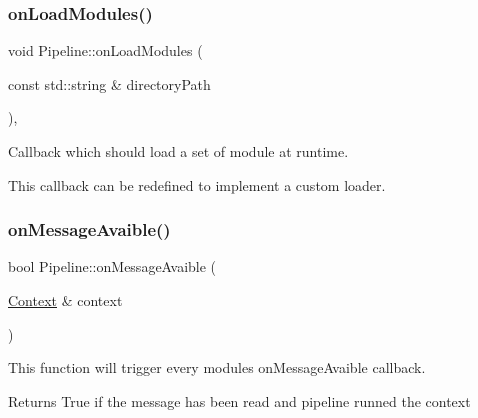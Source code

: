 \subsubsection{\texorpdfstring{onLoadModules()}{onLoadModules()}}
{\footnotesize\ttfamily void Pipeline\+::on\+Load\+Modules (\begin{DoxyParamCaption}\item[{const std\+::string \&}]{directory\+Path }\end{DoxyParamCaption})\hspace{0.3cm}{\ttfamily [protected]}, {\ttfamily [virtual]}}



Callback which should load a set of module at runtime. 

This callback can be redefined to implement a custom loader. \mbox{\label{classo_z_1_1_pipeline_a5dc5181a699312bc35384ad706668e3c}} 
\subsubsection{\texorpdfstring{onMessageAvaible()}{onMessageAvaible()}}
{\footnotesize\ttfamily bool Pipeline\+::on\+Message\+Avaible (\begin{DoxyParamCaption}\item[{\mbox{\hyperlink{classo_z_1_1_context}{Context}} \&}]{context }\end{DoxyParamCaption})\hspace{0.3cm}{\ttfamily [virtual]}}



This function will trigger every module\textquotesingle{}s \textquotesingle{}on\+Message\+Avaible\textquotesingle{} callback. 

\begin{DoxyReturn}{Returns}
True if the message has been read and pipeline runned the context 
\end{DoxyReturn}
\mbox{\label{classo_z_1_1_pipeline_a869b02b2b8953993ccfb882a3e1f3a0f}} 
